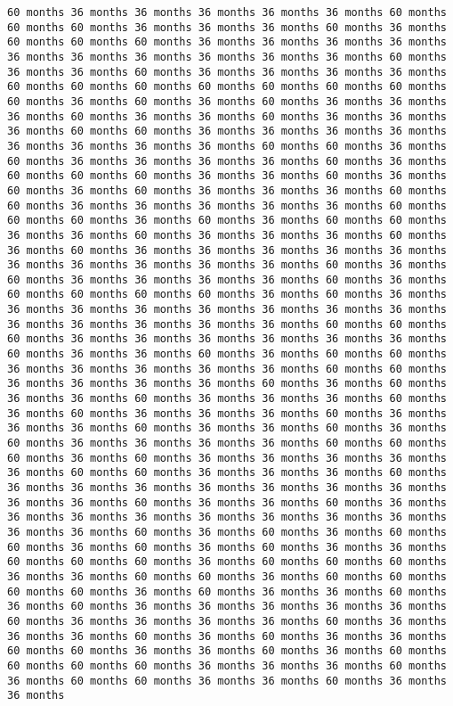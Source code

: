 \documentclass[11pt]{article}
\begin{document}
\begin{Verbatim}[commandchars=\\\{\}, frame=single, framerule=2mm, rulecolor=\color{outerrorbackground}]
60 months 36 months 36 months 36 months 36 months 36 months 60 months 60 months 60 months 36 months 36 months 36 months 60 months 36 months 60 months 60 months 60 months 36 months 36 months 36 months 36 months 36 months 36 months 36 months 36 months 36 months 36 months 60 months 36 months 36 months 60 months 36 months 36 months 36 months 36 months 60 months 60 months 60 months 60 months 60 months 60 months 60 months 60 months 36 months 60 months 36 months 60 months 36 months 36 months 36 months 60 months 36 months 36 months 60 months 36 months 36 months 36 months 60 months 60 months 36 months 36 months 36 months 36 months 36 months 36 months 36 months 36 months 60 months 60 months 36 months 60 months 36 months 36 months 36 months 36 months 60 months 36 months 60 months 60 months 60 months 36 months 36 months 60 months 36 months 60 months 36 months 60 months 36 months 36 months 36 months 60 months 60 months 36 months 36 months 36 months 36 months 36 months 60 months 60 months 60 months 36 months 60 months 36 months 60 months 60 months 36 months 36 months 60 months 36 months 36 months 36 months 60 months 36 months 60 months 36 months 36 months 36 months 36 months 36 months 36 months 36 months 36 months 36 months 36 months 60 months 36 months 60 months 36 months 36 months 36 months 36 months 60 months 36 months 60 months 60 months 60 months 60 months 36 months 60 months 36 months 36 months 36 months 36 months 36 months 36 months 36 months 36 months 36 months 36 months 36 months 36 months 36 months 60 months 60 months 60 months 36 months 36 months 36 months 36 months 36 months 36 months 60 months 36 months 36 months 60 months 36 months 60 months 60 months 36 months 36 months 36 months 36 months 36 months 60 months 60 months 36 months 36 months 36 months 36 months 60 months 36 months 60 months 36 months 36 months 60 months 36 months 36 months 36 months 60 months 36 months 60 months 36 months 36 months 36 months 60 months 36 months 36 months 36 months 60 months 36 months 36 months 60 months 36 months 60 months 36 months 36 months 36 months 36 months 60 months 60 months 60 months 36 months 60 months 36 months 36 months 36 months 36 months 36 months 60 months 60 months 36 months 36 months 36 months 60 months 36 months 36 months 36 months 36 months 36 months 36 months 36 months 36 months 36 months 60 months 36 months 36 months 60 months 36 months 36 months 36 months 36 months 36 months 36 months 36 months 36 months 36 months 36 months 60 months 36 months 60 months 36 months 60 months 60 months 36 months 60 months 36 months 60 months 36 months 36 months 60 months 60 months 60 months 36 months 60 months 60 months 60 months 36 months 36 months 60 months 60 months 36 months 60 months 60 months 60 months 60 months 36 months 60 months 36 months 36 months 60 months 36 months 60 months 36 months 36 months 36 months 36 months 36 months 60 months 36 months 36 months 36 months 36 months 60 months 36 months 36 months 36 months 60 months 36 months 60 months 36 months 36 months 60 months 60 months 36 months 36 months 60 months 36 months 60 months 60 months 60 months 60 months 36 months 36 months 36 months 60 months 36 months 60 months 60 months 36 months 36 months 60 months 36 months 36 months 
\end{Verbatim}
\end{document}
